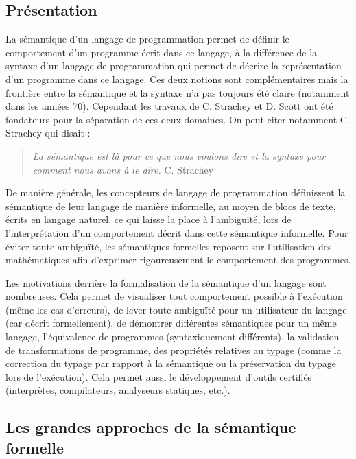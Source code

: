 
  \subsection{Présentation}
  
    La sémantique d'un langage de programmation permet de définir le comportement d'un programme écrit dans ce langage, à la différence de la syntaxe d'un langage de programmation qui permet de décrire la représentation d'un programme dans ce langage. Ces deux notions sont complémentaires mais la frontière entre la sémantique et la syntaxe n'a pas toujours été claire (notamment dans les années 70). Cependant les travaux de C. Strachey et D. Scott ont été fondateurs pour la séparation de ces deux domaines. On peut citer notamment C. Strachey qui disait :
  
  \begin{quote}
      \emph{La sémantique est là pour ce que nous voulons dire et la syntaxe
pour comment nous avons à le dire. } C. Strachey
  \end{quote}
      
  De manière générale, les concepteurs de langage de programmation définissent la sémantique de leur langage de manière informelle, au moyen de blocs de texte, écrits en langage naturel, ce qui laisse la place à l'ambiguïté, lors de l'interprétation d'un comportement décrit dans cette sémantique informelle. Pour éviter toute ambiguïté, les sémantiques formelles reposent sur l'utilisation des mathématiques afin d'exprimer rigoureusement le comportement des programmes.\\\par
        
        Les motivations derrière la formalisation de la sémantique d'un langage sont nombreuses. Cela permet de visualiser tout comportement possible à l'exécution (même les cas d'erreurs), de lever toute ambiguïté pour un utilisateur du langage (car décrit formellement), de démontrer différentes sémantiques pour un même langage, l'équivalence de programmes (syntaxiquement différents), la validation de transformations de programme, des propriétés relatives au typage (comme la correction du typage par rapport à la sémantique ou la préservation du typage lors de l'exécution). Cela permet aussi le développement d'outils certifiés (interprètes, compilateurs, analyseurs statiques, etc.).
      
      \subsection {Les grandes approches de la sémantique formelle}
      
